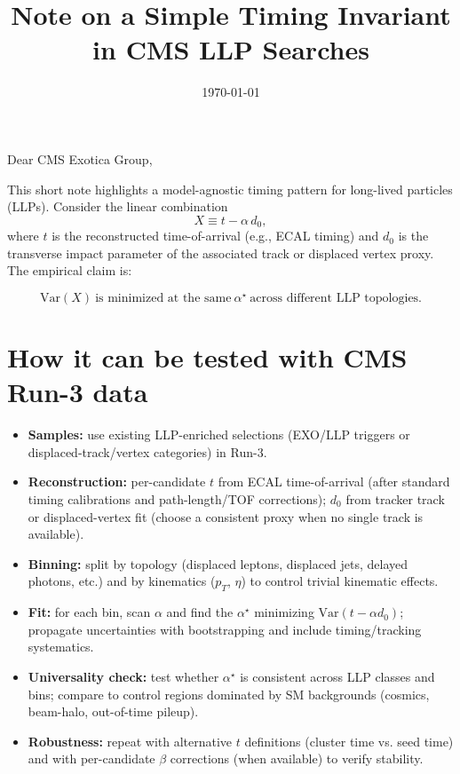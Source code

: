 \documentclass[a4paper,12pt]{article}
\title{Note on a Simple Timing Invariant in CMS LLP Searches}
\author{}
\date{\today}
\begin{document}
\maketitle
{}

Dear CMS Exotica Group,

This short note highlights a model-agnostic timing pattern for long-lived particles (LLPs). Consider the linear combination
\[
X \equiv t - \alpha\, d_0,
\]
where $t$ is the reconstructed time-of-arrival (e.g., ECAL timing) and $d_0$ is the transverse impact parameter of the associated track or displaced vertex proxy. The empirical claim is:

\[
\mathrm{Var}\!\left(X\right) \ \text{is minimized at the same}\ \alpha^\star \ \text{across different LLP topologies.}
\]

\section*{How it can be tested with CMS Run-3 data}
\begin{itemize}
  \item \textbf{Samples:} use existing LLP-enriched selections (EXO/LLP triggers or displaced-track/vertex categories) in Run-3.
  \item \textbf{Reconstruction:} per-candidate $t$ from ECAL time-of-arrival (after standard timing calibrations and path-length/TOF corrections); $d_0$ from tracker track or displaced-vertex fit (choose a consistent proxy when no single track is available).
  \item \textbf{Binning:} split by topology (displaced leptons, displaced jets, delayed photons, etc.) and by kinematics ($p_T$, $\eta$) to control trivial kinematic effects.
  \item \textbf{Fit:} for each bin, scan $\alpha$ and find the $\alpha^\star$ minimizing $\mathrm{Var}(t-\alpha d_0)$; propagate uncertainties with bootstrapping and include timing/tracking systematics.
  \item \textbf{Universality check:} test whether $\alpha^\star$ is consistent across LLP classes and bins; compare to control regions dominated by SM backgrounds (cosmics, beam-halo, out-of-time pileup).
  \item \textbf{Robustness:} repeat with alternative $t$ definitions (cluster time vs. seed time) and with per-candidate $\beta$ corrections (when available) to verify stability.
\end{itemize}
\end{document}
